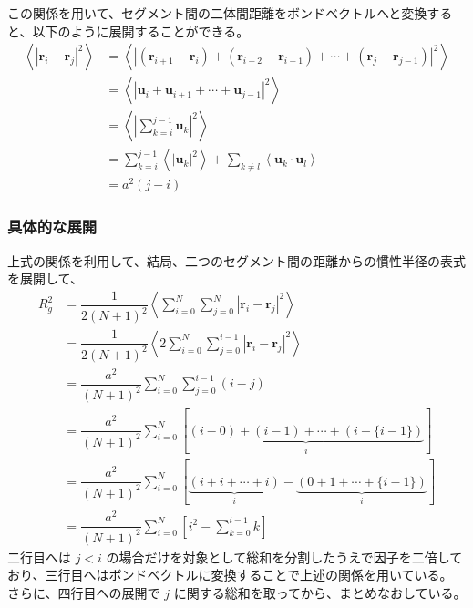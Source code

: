 \documentclass[uplatex,dvipdfmx,a4paper,11pt, titlepage]{jsarticle}
\begin{document}
\begin{appendix}
この関係を用いて、セグメント間の二体間距離をボンドベクトルへと変換すると、以下のように展開することができる。
\begin{align*}
\left \langle \left | \bm{r}_i - \bm{r}_j \right |^2 \right \rangle
	&= \left \langle \left | (\bm{r}_{i+1} - \bm{r}_i) + (\bm{r}_{i+2} - \bm{r}_{i+1}) + \cdots + (\bm{r}_j - \bm{r}_{j-1}) \right |^2 \right \rangle \\
	&= \left \langle \left | \bm{u}_i + \bm{u}_{i+1} + \cdots + \bm{u}_{j-1} \right |^2 \right \rangle \\
	&= \left \langle \left| \sum_{k=i}^{j-1} \bm{u}_{k} \right|^2 \right\rangle \\
	&= \sum_{k=i}^{j-1} \left \langle \left| \bm{u}_{k} \right|^2 \right\rangle + \sum_{k \neq l} \left \langle \bm{u}_{k} \cdot \bm{u}_{l} \right\rangle \\
	&= a^2(j-i)
\end{align*}


\subsubsection{具体的な展開}


上式の関係を利用して、結局、二つのセグメント間の距離からの慣性半径の表式を展開して、
\begin{align*}
R_g^2 
	&= \dfrac{1}{2(N+1)^2} \left \langle \sum_{i=0}^N \sum_{j=0}^N \left|\bm{r}_i - \bm{r}_j \right|^2 \right \rangle\\
	&= \dfrac{1}{2(N+1)^2} \left \langle 2 \sum_{i=0}^N \sum_{j=0}^{i-1} \left|\bm{r}_i - \bm{r}_j \right|^2 \right \rangle\\
	&= \dfrac{a^2}{(N+1)^2} \sum_{i=0}^N \sum_{j=0}^{i-1} (i -j) \\
	&= \dfrac{a^2}{(N+1)^2} \sum_{i=0}^N \left[ \underbrace{(i -0) +(i -1) + \cdots + (i -\{i-1\} ) }_i \right]\\
	&= \dfrac{a^2}{(N+1)^2} \sum_{i=0}^N \left[ \underbrace{(i+i+ \cdots +i ) }_i - \underbrace{(0+1+ \cdots + \{i-1\} ) }_i\right]\\
	&= \dfrac{a^2}{(N+1)^2} \sum_{i=0}^N \left[ i^2 - \sum_{k=0}^{i-1} k \right]
\end{align*}
二行目へは $j < i$ の場合だけを対象として総和を分割したうえで因子を二倍しており、三行目へはボンドベクトルに変換することで上述の関係を用いている。
さらに、四行目への展開で $j$ に関する総和を取ってから、まとめなおしている。


\end{appendix}
\end{document}
